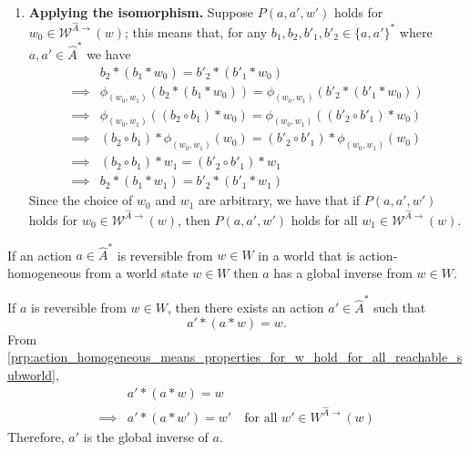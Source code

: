 \begin{proofE}
\begin{enumerate}
    \item \textbf{Applying the isomorphism.}
    Suppose $P(a, a', w')$ holds for $w_{0} \in \mathscr{W}^{\hat{A}\to}(w)$; this means that, for any $b_{1}, b_{2}, b'_{1}, b'_{2} \in \{a, a'\}^{*}$ where $a,a' \in \hat{A}^{*}$ we have
    \begin{align}
        & b_{2} \ast (b_{1} \ast w_{0}) = b'_{2} \ast (b'_{1} \ast w_{0}) \\
        \implies & \phi_{(w_{0}, w_{1})}(b_{2} \ast (b_{1} \ast w_{0})) = \phi_{(w_{0}, w_{1})}(b'_{2} \ast (b'_{1} \ast w_{0})) \\
        \implies & \phi_{(w_{0}, w_{1})}((b_{2} \circ b_{1}) \ast w_{0}) = \phi_{(w_{0}, w_{1})}((b'_{2} \circ b'_{1}) \ast w_{0}) \\
        \implies & (b_{2} \circ b_{1}) \ast \phi_{(w_{0}, w_{1})}(w_{0}) = (b'_{2} \circ b'_{1}) \ast \phi_{(w_{0}, w_{1})}(w_{0}) \\
        \implies & (b_{2} \circ b_{1}) \ast w_{1} = (b'_{2} \circ b'_{1}) \ast w_{1} \\
        \implies & b_{2} \ast (b_{1} \ast w_{1}) = b'_{2} \ast (b'_{1} \ast w_{1})
    \end{align}
    Since the choice of $w_{0}$ and $w_{1}$ are arbitrary, we have that if $P(a, a', w')$ holds for $w_{0} \in \mathscr{W}^{\hat{A}\to}(w)$, then $P(a, a', w')$ holds for all $w_{1} \in \mathscr{W}^{\hat{A}\to}(w)$.
\end{enumerate}
\end{proofE}

\begin{corollaryE}
\label{col:action_homogeneous_world_if_action_is_reversible_it_has_global_inverse}
    If an action $a \in \hat{A}^{*}$ is reversible from $w \in W$ in a world that is action-homogeneous from a world state $w \in W$ then $a$ has a global inverse from $w \in W$.
\end{corollaryE}
\begin{proofE}
    If $a$ is reversible from $w \in W$, then there exists an action $a' \in \hat{A}^{*}$ such that
    \begin{equation}
        a' \ast (a \ast w) = w.
    \end{equation}
    From \cref{prp:action_homogeneous_means_properties_for_w_hold_for_all_reachable_subworld},
    \begin{align}
        & a' \ast (a \ast w) = w \\
        \implies & a' \ast (a \ast w') = w' \quad \text{for all $w' \in W^{\hat{A}\to}(w)$}
    \end{align}
    Therefore, $a'$ is the global inverse of $a$.
\end{proofE}

